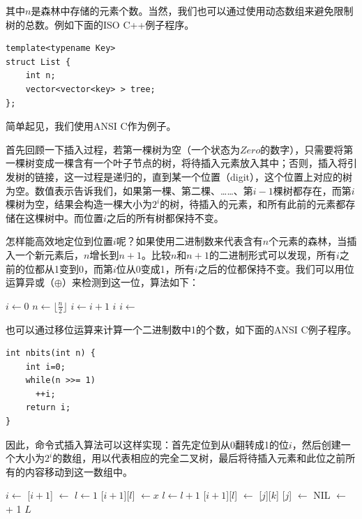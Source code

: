 \documentclass[b5paper]{ctexart}
\begin{document}
其中$n$是森林中存储的元素个数。当然，我们也可以通过使用动态数组来避免限制树的总数。例如下面的ISO C++例子程序。

\lstset{language=C++}
\begin{lstlisting}
template<typename Key>
struct List {
    int n;
    vector<vector<key> > tree;
};
\end{lstlisting}

简单起见，我们使用ANSI C作为例子。

首先回顾一下插入过程，若第一棵树为空（一个状态为$Zero$的数字），只需要将第一棵树变成一棵含有一个叶子节点的树，将待插入元素放入其中；否则，插入将引发树的链接，这一过程是递归的，直到某一个位置（digit），这个位置上对应的树为空。数值表示告诉我们，如果第一棵、第二棵、……、第$i-1$棵树都存在，而第$i$棵树为空，结果会构造一棵大小为$2^i$的树，待插入的元素，和所有此前的元素都存储在这棵树中。而位置$i$之后的所有树都保持不变。

怎样能高效地定位到位置$i$呢？如果使用二进制数来代表含有$n$个元素的森林，当插入一个新元素后，$n$增长到$n+1$。比较$n$和$n+1$的二进制形式可以发现，所有$i$之前的位都从1变到0，而第$i$位从0变成1，所有$i$之后的位都保持不变。我们可以用位运算异或（$\oplus$）来检测到这一位，算法如下：

\begin{algorithmic}
  \State $i \gets 0$
    \State $ n \gets \lfloor \frac{n}{2} \rfloor$
    \State $ i \gets i + 1$
  \EndWhile
  \State \Return $i$
\EndFunction
\Statex
\State $i \gets $ 
\end{algorithmic}

也可以通过移位运算来计算一个二进制数中1的个数，如下面的ANSI C例子程序。

\begin{lstlisting}
int nbits(int n) {
    int i=0;
    while(n >>= 1)
      ++i;
    return i;
}
\end{lstlisting}

因此，命令式插入算法可以这样实现：首先定位到从0翻转成1的位$i$，然后创建一个大小为$2^i$的数组，用以代表相应的完全二叉树，最后将待插入元素和此位之前所有的内容移动到这一数组中。

\begin{algorithmic}
  \State $i \gets $ 
  \State {}[$i+1$] $\gets $ 
  \State $l \gets 1$
  \State  {}[$i+1$][$l$]  $\gets x$
      \State $l \gets l + 1$
      \State {}[$i+1$][$l$]  $\gets$ [$j$][$k$]
    \EndFor
    \State {}[$j$] $\gets$ NIL
  \EndFor
  \State {} $\gets$  + 1
  \State \Return $L$
\EndFunction
\end{algorithmic}
\end{document}
